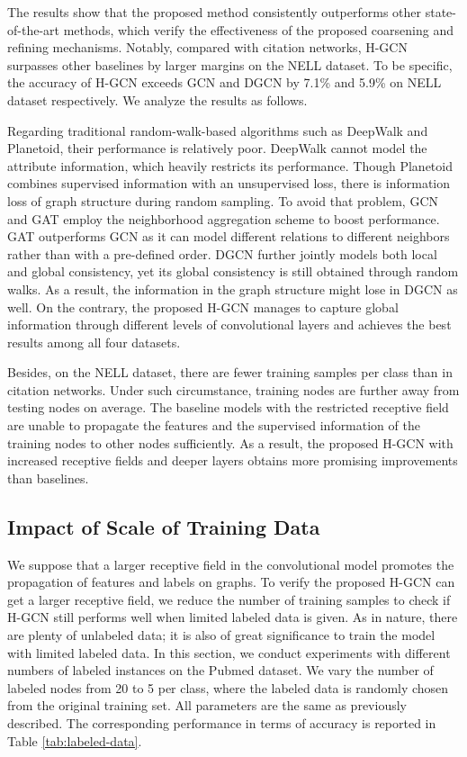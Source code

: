 \documentclass{article}
\begin{document}
The results show that the proposed method consistently outperforms other state-of-the-art methods, which verify the effectiveness of the proposed coarsening and refining mechanisms. Notably, compared with citation networks, H-GCN surpasses other baselines by larger margins on the NELL dataset. To be specific, the accuracy of H-GCN exceeds GCN and DGCN by 7.1\% and 5.9\% on NELL dataset respectively. We analyze the results as follows.

Regarding traditional random-walk-based algorithms such as DeepWalk and Planetoid, their performance is relatively poor. DeepWalk cannot model the attribute information, which heavily restricts its performance. Though Planetoid combines supervised information with an unsupervised loss, there is information loss of graph structure during random sampling. To avoid that problem, GCN and GAT employ the neighborhood aggregation scheme to boost performance. GAT outperforms GCN as it can model different relations to different neighbors rather than with a pre-defined order. DGCN further jointly models both local and global consistency, yet its global consistency is still obtained through random walks. As a result, the information in the graph structure might lose in DGCN as well. On the contrary, the proposed H-GCN manages to capture global information through different levels of convolutional layers and achieves the best results among all four datasets.

Besides, on the NELL dataset, there are fewer training samples per class than in citation networks. Under such circumstance, training nodes are further away from testing nodes on average. The baseline models with the restricted receptive field are unable to propagate the features and the supervised information of the training nodes to other nodes sufficiently. As a result, the proposed H-GCN with increased receptive fields and deeper layers obtains more promising improvements than baselines.

\subsection{Impact of Scale of Training Data}

We suppose that a larger receptive field in the convolutional model promotes the propagation of features and labels on graphs. To verify the proposed H-GCN can get a larger receptive field, we reduce the number of training samples to check if H-GCN still performs well when limited labeled data is given. As in nature, there are plenty of unlabeled data; it is also of great significance to train the model with limited labeled data. In this section, we conduct experiments with different numbers of labeled instances on the Pubmed dataset. We vary the number of labeled nodes from 20 to 5 per class, where the labeled data is randomly chosen from the original training set. All parameters are the same as previously described. The corresponding performance in terms of accuracy is reported in Table \ref{tab:labeled-data}.
\end{document}
